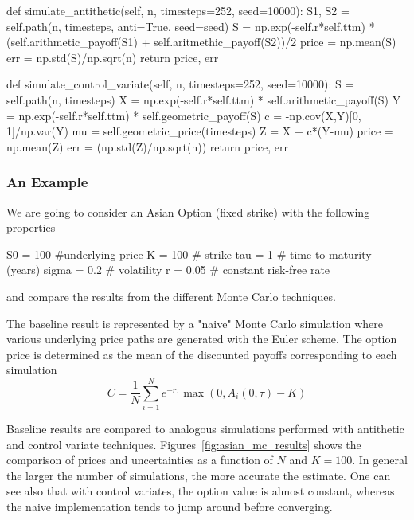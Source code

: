 \begin{ipython}
  def simulate_antithetic(self, n, timesteps=252, seed=10000):
    S1, S2 = self.path(n, timesteps, anti=True, seed=seed)
    S = np.exp(-self.r*self.ttm) *\\
        (self.arithmetic_payoff(S1) + self.aritmethic_payoff(S2))/2
    price = np.mean(S)
    err = np.std(S)/np.sqrt(n)
    return price, err
    
  def simulate_control_variate(self, n, timesteps=252, seed=10000):
    S = self.path(n, timesteps)
    X = np.exp(-self.r*self.ttm) * self.arithmetic_payoff(S)
    Y = np.exp(-self.r*self.ttm) * self.geometric_payoff(S)
    c = -np.cov(X,Y)[0, 1]/np.var(Y)
    mu = self.geometric_price(timesteps)
    Z = X + c*(Y-mu)
    price = np.mean(Z)
    err = (np.std(Z)/np.sqrt(n))
    return price, err
\end{ipython}

\subsubsection{An Example}
We are going to consider an Asian Option (fixed strike) with the following properties
\begin{ipython}
S0 = 100 #underlying price
K = 100 # strike
tau = 1 # time to maturity (years)
sigma = 0.2 # volatility
r = 0.05 # constant risk-free rate
\end{ipython}
and compare the results from the different Monte Carlo techniques.

The baseline result is represented by a "naive" Monte Carlo simulation where various underlying price paths are generated with the Euler scheme. The option price is determined as the mean of the discounted payoffs corresponding to each simulation
\begin{equation*}
C = \frac{1}{N}\sum_{i=1}^{N} e^{-r\tau}\max(0, A_i(0, \tau)-K)
\end{equation*}

Baseline results are compared to analogous simulations performed with antithetic and control variate techniques.
Figures~\ref{fig:asian_mc_results} shows the comparison of prices and uncertainties as a function of $N$ and $K=100$.
In general the larger the number of simulations, the more accurate the estimate.
One can see also that with control variates, the option value is almost constant, whereas the naive implementation tends to jump around before converging.

